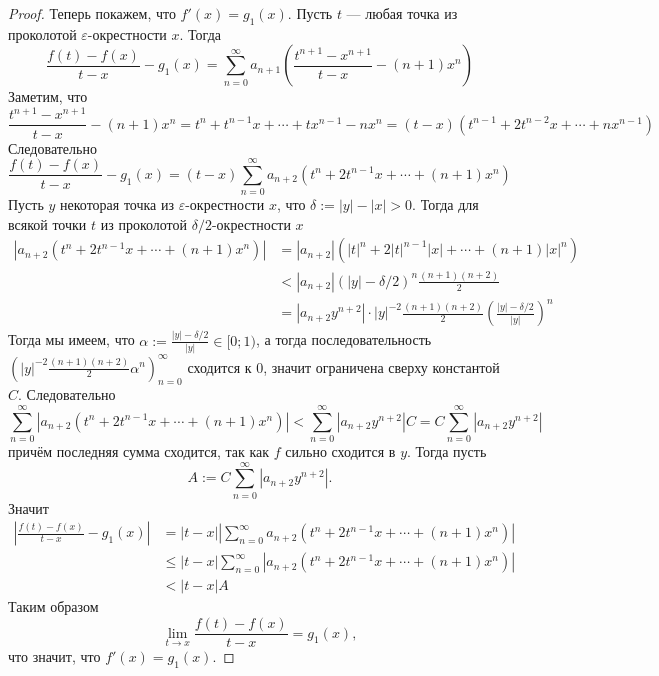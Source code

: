 \documentclass[12pt,a4paper]{article}
\begin{document}
\begin{proof}
        Теперь покажем, что $f'(x) = g_1(x)$. Пусть $t$ --- любая точка из проколотой $\varepsilon$-окрестности $x$. Тогда
        \[
            \frac{f(t)-f(x)}{t-x} - g_1(x)
            = \sum_{n=0}^\infty a_{n+1}\left(\frac{t^{n+1} - x^{n+1}}{t - x} - (n+1) x^n\right)
        \]
        Заметим, что
        \[
            \frac{t^{n+1} - x^{n+1}}{t - x} - (n+1) x^n
            = t^n + t^{n-1}x + \cdots + tx^{n-1} - n x^n
            = (t-x)(t^{n-1} + 2t^{n-2}x + \cdots + n x^{n-1})
        \]
        Следовательно
        \[\frac{f(t)-f(x)}{t-x} - g_1(x) = (t-x) \sum_{n=0}^\infty a_{n+2}(t^n + 2t^{n-1}x + \cdots + (n+1) x^n)\]
        Пусть $y$ некоторая точка из $\varepsilon$-окрестности $x$, что $\delta := |y| - |x| > 0$. Тогда для всякой точки $t$ из проколотой $\delta/2$-окрестности $x$
        \begin{align*}
            |a_{n+2}(t^n + 2t^{n-1}x + \cdots + (n+1) x^n)|
            &= |a_{n+2}| (|t|^n + 2|t|^{n-1}|x| + \cdots + (n+1) |x|^n)\\
            &< |a_{n+2}| (|y| - \delta/2)^n \frac{(n+1)(n+2)}{2}\\
            &= |a_{n+2} y^{n+2}| \cdot |y|^{-2} \frac{(n+1)(n+2)}{2} \left(\frac{|y|-\delta/2}{|y|}\right)^n
        \end{align*}
        Тогда мы имеем, что $\alpha := \frac{|y|-\delta/2}{|y|} \in [0; 1)$, а тогда последовательность $\left(|y|^{-2} \frac{(n+1)(n+2)}{2} \alpha^n\right)_{n=0}^\infty$ сходится к $0$, значит ограничена сверху константой $C$. Следовательно
        \[
            \sum_{n=0}^\infty |a_{n+2}(t^n + 2t^{n-1}x + \cdots + (n+1) x^n)|
            < \sum_{n=0}^\infty |a_{n+2} y^{n+2}| C
            = C \sum_{n=0}^\infty |a_{n+2} y^{n+2}|
        \]
        причём последняя сумма сходится, так как $f$ сильно сходится в $y$. Тогда пусть
        \[A := C \sum_{n=0}^\infty |a_{n+2} y^{n+2}|.\]
        Значит
        \begin{align*}
            \left|\frac{f(t)-f(x)}{t-x} - g_1(x)\right|
            &= |t-x| \left|\sum_{n=0}^\infty a_{n+2}(t^n + 2t^{n-1}x + \cdots + (n+1) x^n)\right|\\
            &\leqslant |t-x| \sum_{n=0}^\infty |a_{n+2}(t^n + 2t^{n-1}x + \cdots + (n+1) x^n)|\\
            &< |t-x| A
        \end{align*}
        Таким образом
        \[\lim_{t \to x} \frac{f(t) - f(x)}{t-x} = g_1(x),\]
        что значит, что $f'(x) = g_1(x)$.
    \end{proof}
\end{document}
